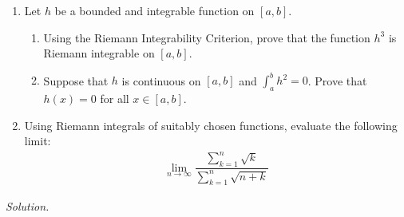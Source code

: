 \documentclass[11pt]{amsart}
\theoremstyle{plain}
\numberwithin{equation}{section}
\begin{document}
\begin{enumerate}[label=\textbf{(\alph*)}]
    \itemsep 0em
    \item Let $h$ be a bounded and integrable function on $[a,b]$.
    \begin{enumerate}[label=\textbf{(\roman*)}]
        \itemsep 0em
        \item Using the Riemann Integrability Criterion, prove that the function $h^{3}$ is Riemann integrable on $[a,b]$.
        \item Suppose that $h$ is continuous on $[a,b]$ and $\displaystyle \int_{a}^{b}h^{2}=0$. Prove that $h(x)=0$ for all $x\in[a,b]$.
    \end{enumerate}
    \item Using Riemann integrals of suitably chosen functions, evaluate the following limit:
\begin{align*}
    \lim_{n\to\infty}\dfrac{\displaystyle\sum_{k=1}^{n}\sqrt{k}}{\displaystyle\sum_{k=1}^{n}\sqrt{n+k}}
\end{align*}
\end{enumerate}
\noindent\emph{Solution.}
\end{document}
